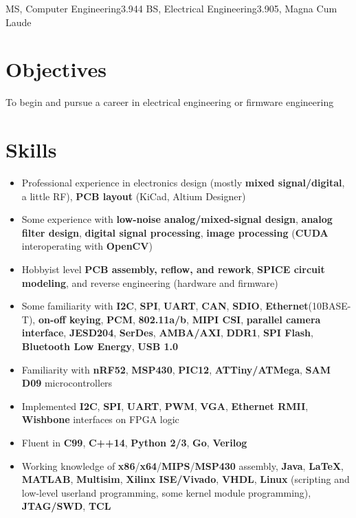 \documentclass{my_resume}
\begin{document}

    {MS, Computer Engineering}{3.944}
	{BS, Electrical Engineering}{3.905, Magna Cum Laude}

\section{Objectives}
To begin and pursue a career in electrical engineering or firmware engineering

\section{Skills}
\begin{itemize}[noitemsep]
    \item Professional experience in electronics design (mostly \textbf{mixed signal/digital}, a little RF), \textbf{PCB layout} (KiCad, Altium Designer)
    \item Some experience with \textbf{low-noise analog/mixed-signal design}, \textbf{analog filter design}, \textbf{digital signal processing}, \textbf{image processing} (\textbf{CUDA} interoperating with \textbf{OpenCV})
    \item Hobbyist level \textbf{PCB assembly, reflow, and rework}, \textbf{SPICE circuit modeling}, and reverse engineering (hardware and firmware)
    \item Some familiarity with \textbf{I2C}, \textbf{SPI}, \textbf{UART}, \textbf{CAN}, \textbf{SDIO}, \textbf{Ethernet}(10BASE-T), \textbf{on-off keying}, \textbf{PCM}, \textbf{802.11a/b}, \textbf{MIPI CSI}, \textbf{parallel camera interface}, \textbf{JESD204}, \textbf{SerDes}, \textbf{AMBA/AXI}, \textbf{DDR1}, \textbf{SPI Flash}, \textbf{Bluetooth Low Energy}, \textbf{USB 1.0}
    \item Familiarity with \textbf{nRF52}, \textbf{MSP430}, \textbf{PIC12}, \textbf{ATTiny/ATMega}, \textbf{SAM D09} microcontrollers
    \item Implemented \textbf{I2C}, \textbf{SPI}, \textbf{UART}, \textbf{PWM}, \textbf{VGA}, \textbf{Ethernet RMII}, \textbf{Wishbone} interfaces on FPGA logic
    \item Fluent in \textbf{C99}, \textbf{C++14}, \textbf{Python 2/3}, \textbf{Go}, \textbf{Verilog}
    \item Working knowledge of \textbf{x86}/\textbf{x64}/\textbf{MIPS}/\textbf{MSP430} assembly, \textbf{Java}, \textbf{LaTeX}, \textbf{MATLAB}, \textbf{Multisim}, \textbf{Xilinx ISE/Vivado}, \textbf{VHDL}, \textbf{Linux} (scripting and low-level userland programming, some kernel module programming), \textbf{JTAG/SWD}, \textbf{TCL}
\end{itemize}
\end{document}

